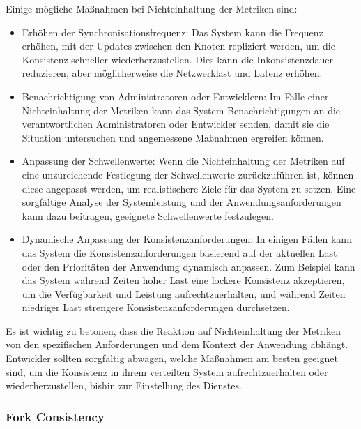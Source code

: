 Einige mögliche Maßnahmen bei Nichteinhaltung der Metriken sind:
\begin{itemize}
\item Erhöhen der Synchronisationsfrequenz: Das System kann die Frequenz erhöhen, mit der Updates zwischen den Knoten repliziert werden, um die Konsistenz schneller wiederherzustellen. Dies kann die Inkonsistenzdauer reduzieren, aber möglicherweise die Netzwerklast und Latenz erhöhen.
\item Benachrichtigung von Administratoren oder Entwicklern: Im Falle einer Nichteinhaltung der Metriken kann das System Benachrichtigungen an die verantwortlichen Administratoren oder Entwickler senden, damit sie die Situation untersuchen und angemessene Maßnahmen ergreifen können.
\item Anpassung der Schwellenwerte: Wenn die Nichteinhaltung der Metriken auf eine unzureichende Festlegung der Schwellenwerte zurückzuführen ist, können diese angepasst werden, um realistischere Ziele für das System zu setzen. Eine sorgfältige Analyse der Systemleistung und der Anwendungsanforderungen kann dazu beitragen, geeignete Schwellenwerte festzulegen.
\item Dynamische Anpassung der Konsistenzanforderungen: In einigen Fällen kann das System die Konsistenzanforderungen basierend auf der aktuellen Last oder den Prioritäten der Anwendung dynamisch anpassen. Zum Beispiel kann das System während Zeiten hoher Last eine lockere Konsistenz akzeptieren, um die Verfügbarkeit und Leistung aufrechtzuerhalten, und während Zeiten niedriger Last strengere Konsistenzanforderungen durchsetzen.
\end{itemize}
Es ist wichtig zu betonen, dass die Reaktion auf Nichteinhaltung der Metriken von den spezifischen Anforderungen und dem Kontext der Anwendung abhängt. Entwickler sollten sorgfältig abwägen, welche Maßnahmen am besten geeignet sind, um die Konsistenz in ihrem verteilten System aufrechtzuerhalten oder wiederherzustellen, bishin zur Einstellung des Dienstes. 




\subsubsection{Fork Consistency}


